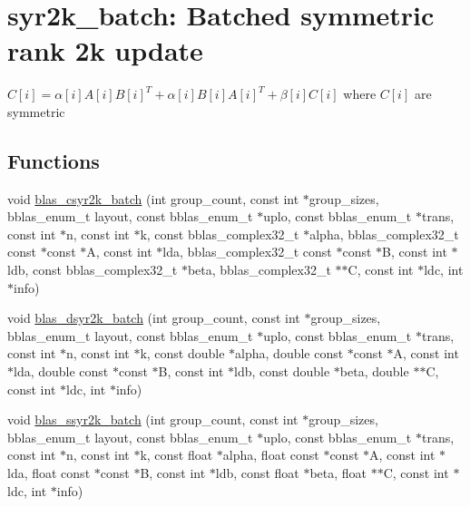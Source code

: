 \hypertarget{group__syr2k__batch}{}\section{syr2k\+\_\+batch\+: Batched symmetric rank 2k update}
\label{group__syr2k__batch}


$ C[i] = \alpha[i] A[i] B[i]^T + \alpha[i] B[i] A[i]^T + \beta[i] C[i] $ where $ C[i] $ are symmetric  


\subsection*{Functions}
\begin{DoxyCompactItemize}
\item 
void \mbox{\hyperlink{group__syr2k__batch_ga8dff27bde64036cc0861a200e82764c1}{blas\+\_\+csyr2k\+\_\+batch}} (int group\+\_\+count, const int $\ast$group\+\_\+sizes, bblas\+\_\+enum\+\_\+t layout, const bblas\+\_\+enum\+\_\+t $\ast$uplo, const bblas\+\_\+enum\+\_\+t $\ast$trans, const int $\ast$n, const int $\ast$k, const bblas\+\_\+complex32\+\_\+t $\ast$alpha, bblas\+\_\+complex32\+\_\+t const $\ast$const $\ast$A, const int $\ast$lda, bblas\+\_\+complex32\+\_\+t const $\ast$const $\ast$B, const int $\ast$ldb, const bblas\+\_\+complex32\+\_\+t $\ast$beta, bblas\+\_\+complex32\+\_\+t $\ast$$\ast$C, const int $\ast$ldc, int $\ast$info)
\item 
void \mbox{\hyperlink{group__syr2k__batch_ga92363ade2cc637cbb79d139085ac715f}{blas\+\_\+dsyr2k\+\_\+batch}} (int group\+\_\+count, const int $\ast$group\+\_\+sizes, bblas\+\_\+enum\+\_\+t layout, const bblas\+\_\+enum\+\_\+t $\ast$uplo, const bblas\+\_\+enum\+\_\+t $\ast$trans, const int $\ast$n, const int $\ast$k, const double $\ast$alpha, double const $\ast$const $\ast$A, const int $\ast$lda, double const $\ast$const $\ast$B, const int $\ast$ldb, const double $\ast$beta, double $\ast$$\ast$C, const int $\ast$ldc, int $\ast$info)
\item 
void \mbox{\hyperlink{group__syr2k__batch_ga644c1621654e2a6df012fc6d50cdcac7}{blas\+\_\+ssyr2k\+\_\+batch}} (int group\+\_\+count, const int $\ast$group\+\_\+sizes, bblas\+\_\+enum\+\_\+t layout, const bblas\+\_\+enum\+\_\+t $\ast$uplo, const bblas\+\_\+enum\+\_\+t $\ast$trans, const int $\ast$n, const int $\ast$k, const float $\ast$alpha, float const $\ast$const $\ast$A, const int $\ast$lda, float const $\ast$const $\ast$B, const int $\ast$ldb, const float $\ast$beta, float $\ast$$\ast$C, const int $\ast$ldc, int $\ast$info)
$$
\end{DoxyCompactItemize}
